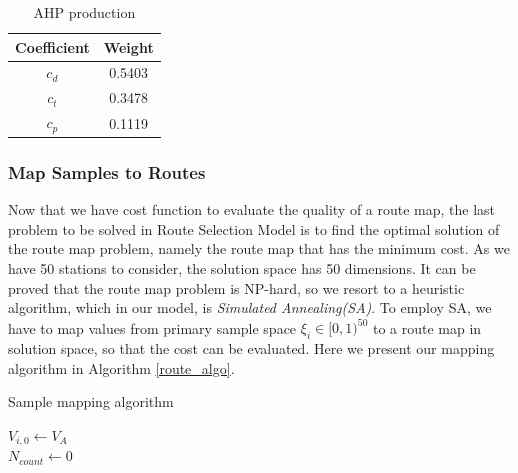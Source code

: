 \documentclass{mcmthesis}
\begin{document}
\begin{table}[h]
    \centering
    \caption{AHP production}
    \label{tab:AHP}
    \linespread{1.5}
    \begin{tabular}{c c}
\hline
    	Coefficient & Weight\\
\hline
	$c_d$ & 0.5403\\
	$c_t$ & 0.3478\\
	$c_p$ & 0.1119\\
\hline
    \end{tabular}
    \label{ahp_tab}
\end{table}

\subsubsection{Map Samples to Routes}
Now that we have cost function to evaluate the quality of a route map, the last problem to be solved in Route Selection Model is to find the optimal solution of the route map problem, namely the route map that has the minimum cost. As we have 50 stations to consider, the solution space has 50 dimensions. It can be proved that the route map problem is NP-hard, so we resort to a heuristic algorithm, which in our model, is \emph{Simulated Annealing(SA)}. To employ SA, we have to map values from primary sample space $\xi_{i} \in [0, 1)^{50}$ to a route map in solution space, so that the cost can be evaluated. Here we present our mapping algorithm in Algorithm \ref{route_algo}.

\begin{algorithm}[H]
\caption{Sample mapping algorithm}
\LinesNumbered
{}
$V_{i,0} \leftarrow V_A$ \\
$N_{count} \leftarrow 0$ \\
\label{route_algo}
\end{algorithm}
\end{document}
